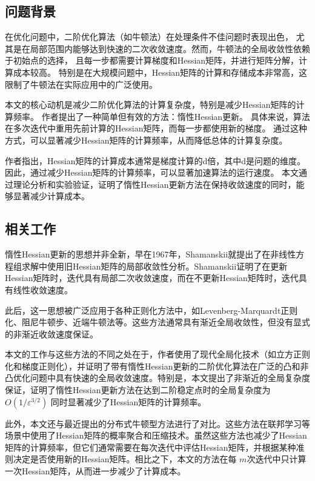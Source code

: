 \documentclass[a4paper,twoside,AutoFakeBold]{article}
\theoremstyle{definition}
\begin{document}
\subsection{问题背景}
在优化问题中，二阶优化算法（如牛顿法）在处理条件不佳问题时表现出色，
尤其是在局部范围内能够达到快速的二次收敛速度。然而，牛顿法的全局收敛性依赖于初始点的选择，
且每一步都需要计算梯度和Hessian矩阵，并进行矩阵分解，计算成本较高。
特别是在大规模问题中，Hessian矩阵的计算和存储成本非常高，这限制了牛顿法在实际应用中的广泛使用。

本文的核心动机是减少二阶优化算法的计算复杂度，特别是减少Hessian矩阵的计算频率。
作者提出了一种简单但有效的方法：惰性Hessian更新。
具体来说，算法在多次迭代中重用先前计算的Hessian矩阵，而每一步都使用新的梯度。
通过这种方式，可以显著减少Hessian矩阵的计算频率，从而降低总体的计算复杂度。

作者指出，Hessian矩阵的计算成本通常是梯度计算的d倍，其中d是问题的维度。
因此，通过减少Hessian矩阵的计算频率，可以显著加速算法的运行速度。
本文通过理论分析和实验验证，证明了惰性Hessian更新方法在保持收敛速度的同时，能够显著减少计算成本。

\subsection{相关工作}

惰性Hessian更新的思想并非全新，早在1967年，Shamanskii就提出了在非线性方程组求解中使用旧Hessian矩阵的局部收敛性分析。Shamanskii证明了在更新Hessian矩阵时，迭代具有局部二次收敛速度，而在不更新Hessian矩阵时，迭代具有线性收敛速度。

此后，这一思想被广泛应用于各种正则化方法中，如Levenberg-Marquardt正则化、阻尼牛顿步、近端牛顿法等。这些方法通常具有渐近全局收敛性，但没有显式的非渐近收敛速度保证。

本文的工作与这些方法的不同之处在于，作者使用了现代全局化技术（如立方正则化和梯度正则化），并证明了带有惰性Hessian更新的二阶优化算法在广泛的凸和非凸优化问题中具有快速的全局收敛速度。特别是，本文提出了非渐近的全局复杂度保证，证明了惰性Hessian更新方法在达到二阶稳定点时的全局复杂度为
$O(1/ε^{3/2})$
同时显著减少了Hessian矩阵的计算频率。

此外，本文还与最近提出的分布式牛顿型方法进行了对比。这些方法在联邦学习等场景中使用了Hessian矩阵的概率聚合和压缩技术。虽然这些方法也减少了Hessian矩阵的计算频率，但它们通常需要在每次迭代中评估Hessian矩阵，并根据某种准则决定是否使用新的Hessian矩阵。相比之下，本文的方法在每
$m$次迭代中只计算一次Hessian矩阵，从而进一步减少了计算成本。
\end{document}
